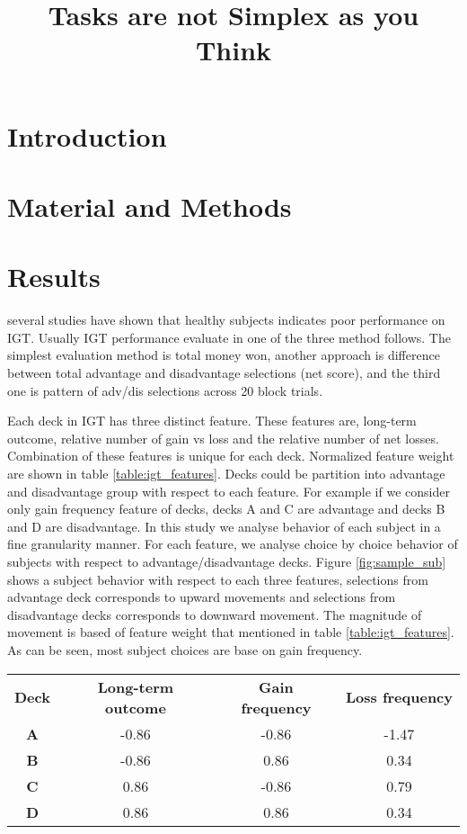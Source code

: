 \documentclass[12pt,twocolumn]{elsarticle}
\title{Tasks are not Simplex as you Think}
\author{}
\begin{document}
\maketitle
\section{Introduction}
\section{Material and Methods}
\section{Results}
several studies have shown that healthy subjects indicates
poor performance on IGT. Usually IGT performance evaluate in
one of the three method follows. The simplest evaluation
method is total money won, another approach is difference
between total advantage and disadvantage selections (net
score), and the third one is pattern of adv/dis selections
across 20 block
trials.


Each deck in IGT has three distinct feature. These features
are, long-term outcome, relative number of gain vs loss and
the relative number of net losses. Combination of these
features is unique for each deck.
Normalized feature weight are shown in table \ref{table:igt_features}.
Decks could be partition into advantage and disadvantage
group with respect to each feature. For example if we
consider only gain frequency feature of decks, decks A and C
are advantage and decks B and D are disadvantage. In this
study we analyse behavior of each subject in a fine
granularity manner. For each feature, we analyse choice by
choice behavior of subjects with respect to advantage/disadvantage decks.
Figure \ref{fig:sample_sub} shows a subject behavior with respect to each three
features, selections from advantage deck corresponds to
upward movements and selections from disadvantage
decks corresponds to downward movement. The magnitude of
movement is based of feature weight that mentioned in table \ref{table:igt_features}. 
As can be seen, most subject choices are base on gain
frequency. 

\begin{table*}
\caption{Normalized weight of features in IGT}
\label{table:igt_features}
\centering
\begin{tabular}{cccc}
\textbf{Deck} & \textbf{Long-term outcome} & \textbf{Gain frequency} & \textbf{Loss frequency} \\ 
\textbf{A} & -0.86  & -0.86 & -1.47 \\ 
\textbf{B} & -0.86  &  0.86 &  0.34 \\ 
\textbf{C} &  0.86  & -0.86 &  0.79 \\ 
\textbf{D} &  0.86  &  0.86 &  0.34 \\ 
\end{tabular} 
\end{table*}
\end{document}

